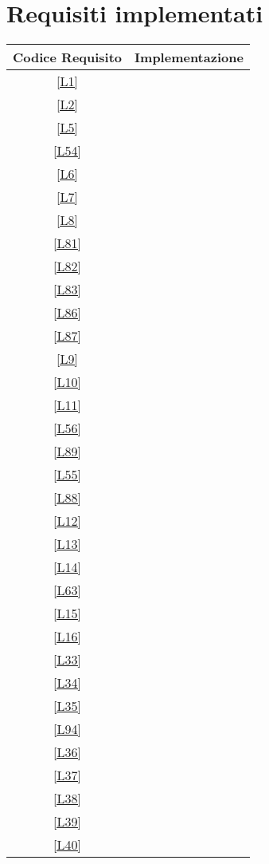 \section{Requisiti implementati}
\begin{longtable}{|c|c|}
	\hline \textbf{Codice Requisito} & \textbf{Implementazione} \\
	\hline \ref{L1} & \si \\ %
	\hline \ref{L2} & \no \\
	\hline \ref{L5} & \si  \\	
	\hline \ref{L54} & \no \\
	\hline \ref{L6} & \si \\ %
	\hline \ref{L7} & \si \\
	\hline \ref{L8} & \si \\
	\hline \ref{L81} & \si \\
	\hline \ref{L82} & \si \\
	\hline \ref{L83} & \si \\ %
	\hline \ref{L86} & \si \\
	\hline \ref{L87} & \si \\
	\hline \ref{L9} & \si \\
	\hline \ref{L10} & \si \\
	\hline \ref{L11} & \si  \\ %
	\hline \ref{L56} & \si \\
	\hline \ref{L89} & \si \\
	\hline \ref{L55} & \si \\
	\hline \ref{L88} & \si \\
	\hline \ref{L12} & \si \\ %
	\hline \ref{L13} & \si \\
	\hline \ref{L14} & \si \\
	\hline \ref{L63} & \si \\
	\hline \ref{L15} & \si \\
	\hline \ref{L16} & \si \\ %
	\hline \ref{L33} & \si \\
	\hline \ref{L34} & \si \\
	\hline \ref{L35} & \no \\
	\hline \ref{L94} & \no \\
	\hline \ref{L36} & \no \\ %
	\hline \ref{L37} & \no  \\
	\hline \ref{L38} & \si \\
	\hline \ref{L39} & \no \\
	\hline \ref{L40} & \no \\	

\end{longtable}
